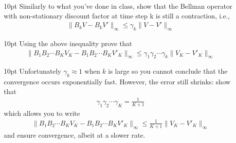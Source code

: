 \documentclass[11pt]{article}
\begin{document}
\begin{enumerate}
\item [10pt] Similarly to what you've done in class, show that the Bellman operator with non-stationary discount factor at time step k is still a contraction, i.e.,  
\begin{align}
\| B_k V - B_k V' \|_\infty
\leq \gamma_k \|V - V' \|_\infty
\end{align}
\item [10pt] Using the above inequality prove that
\begin{align}
\| B_1B_2 \cdots B_K V_K -  B_1B_2 \cdots B_K V'_K \|_\infty
\leq \gamma_1 \gamma_2 \cdots \gamma_k \|V_K - V'_K \|_\infty
\end{align}
\item [10pt] Unfortunately $\gamma_k \approx 1$ when $k$ is large so you cannot conclude that the convergence occurs exponentially fast. However, the error still shrinks: show that
\begin{align}
  \gamma_1 \gamma_2 \cdots \gamma_K = \frac{1}{K+1}
\end{align}
which allows you to write
\begin{align}
\| B_1B_2 \cdots B_K V_K -  B_1B_2 \cdots B_K V'_K \|_\infty \leq \frac{1}{K+1} \|V_K - V'_K \|_\infty
\end{align}
and ensure convergence, albeit at a slower rate.
\end{enumerate}
\end{document}

